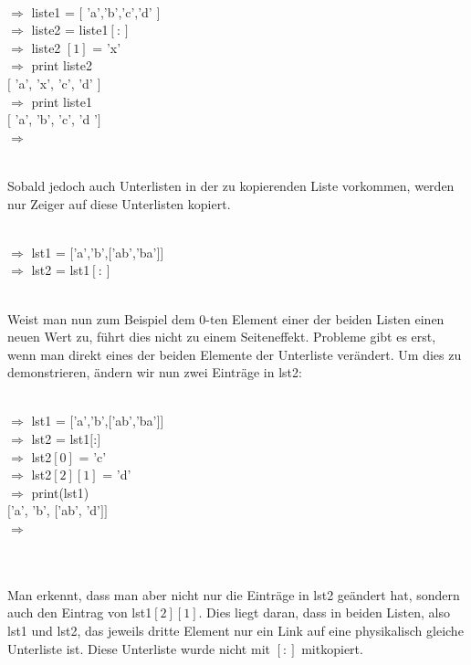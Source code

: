 \\
\begin{MyConsoleBox}{
${\Longrightarrow}$ liste1 = $[$ 'a','b','c','d' $]$ \\
${\Longrightarrow}$ liste2 = liste1$[:]$           \\
${\Longrightarrow}$ liste2 $[1]$ = 'x'              \\
${\Longrightarrow}$ print liste2  \\
$[$ 'a', 'x', 'c', 'd' $]$ \\
${\Longrightarrow}$ print liste1 \\
$[$ 'a', 'b', 'c', 'd '$]$ \\
${\Longrightarrow}$
}\end{MyConsoleBox}
\\
Sobald jedoch auch Unterlisten in der zu kopierenden Liste vorkommen, werden nur Zeiger auf diese Unterlisten kopiert. \\
\\
\begin{MyConsoleBox}{
${\Longrightarrow}$ lst1 = $[$'a','b',$[$'ab','ba'$]]$ \\
${\Longrightarrow}$ lst2 = lst1$[:]$
}\end{MyConsoleBox}
\\
Weist man nun zum Beispiel dem 0-ten Element einer der beiden Listen einen neuen Wert zu, führt dies nicht zu einem Seiteneffekt. Probleme gibt es erst, wenn man direkt eines der beiden Elemente der Unterliste verändert.
Um dies zu demonstrieren, ändern wir nun zwei Einträge in lst2: \\
\\
\begin{MyConsoleBox}{
${\Longrightarrow}$ lst1 = $[$'a','b',$[$'ab','ba'$]]$ \\
${\Longrightarrow}$ lst2 = lst1$[$:$]$ \\
${\Longrightarrow}$ lst2$[0]$ = 'c' \\
${\Longrightarrow}$ lst2$[2][1]$ = 'd' \\
${\Longrightarrow}$ print(lst1) \\
$[$'a', 'b', $[$'ab', 'd'$]]$ \\
${\Longrightarrow}$
}\end{MyConsoleBox}
\\ \\
Man erkennt, dass man aber nicht nur die Einträge in lst2 geändert hat, sondern auch den Eintrag von lst1$[2][1]$.
Dies liegt daran, dass in beiden Listen, also lst1 und lst2, das jeweils dritte Element nur ein Link auf eine physikalisch gleiche Unterliste ist. Diese Unterliste wurde nicht mit $[:]$ mitkopiert. \\
\\
